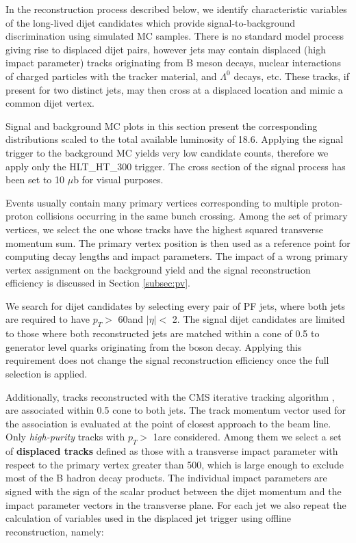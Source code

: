 In the reconstruction process described below, we identify characteristic variables
of the long-lived dijet candidates which provide
signal-to-background discrimination using simulated MC samples.    
There is no standard model process giving rise to displaced dijet pairs,
however jets may contain displaced (high impact parameter) tracks originating from B meson decays, nuclear
interactions of charged particles with the tracker material, \Kshort and $\Lambda^0$ decays, etc. These tracks, if 
present for two distinct jets,
may then cross at a displaced location and mimic a common dijet vertex. 

Signal and background MC plots in this section present the corresponding distributions 
scaled to the total available luminosity
of 18.6\fbinv. Applying the signal trigger to the background MC yields very low candidate counts, therefore
we apply only the HLT\_HT\_300 trigger.  
 The cross section of the signal process has been set to 10 $\mu$b for visual purposes.   

Events usually contain many primary vertices corresponding to multiple proton-proton collisions occurring 
in the same bunch crossing.
Among the set of primary vertices, we select the one whose tracks have the highest squared transverse momentum sum.
 The primary vertex position is
then used as a reference point for computing decay lengths and impact parameters. The impact of a wrong
primary vertex assignment on the background yield and the signal reconstruction efficiency is discussed
in Section \ref{subsec:pv}. 


We search for dijet candidates by selecting every pair of PF jets, where both jets are required to 
have $p_T>$ 60\GeV and $|\eta|<$ 2. 
The signal dijet candidates are limited
to those where both reconstructed jets are matched within a cone of 0.5 to generator level quarks originating
 from the \X boson decay. Applying this requirement does not change the signal reconstruction efficiency
once the full selection is applied. 

 
Additionally, tracks reconstructed with 
the CMS iterative tracking
algorithm \cite{CMS_IN_2007-065}, are associated within 0.5 cone to both jets. The track momentum vector used for 
the association is evaluated at the point of closest approach to the beam line. Only {\it high-purity} tracks
with $p_T>$ 1\GeV are considered. Among them we select a set of {\bf displaced tracks} defined as those with
a transverse impact parameter with respect to the primary vertex greater than 500\micron, which is large enough
to exclude most of the B hadron decay products. 
The individual impact parameters are signed with the sign of the scalar product between
 the dijet momentum and the impact parameter vectors in the transverse plane.
For each jet we also repeat the calculation of variables used in the displaced jet trigger
 using offline reconstruction, namely:

